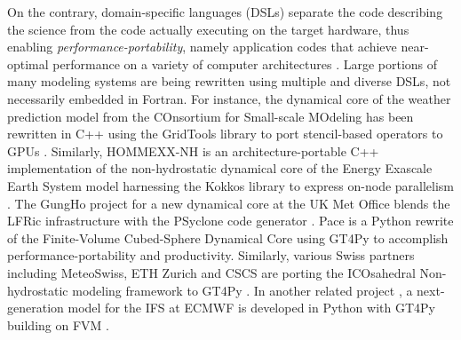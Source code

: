 \documentclass[gmd,manuscript,online]{copernicus}
\begin{document}
	On the contrary, domain-specific languages (DSLs) separate the code describing the science from the code actually executing on the target hardware, thus enabling \emph{performance-portability}, namely application codes that achieve near-optimal performance on a variety of computer architectures \citep{deakin19}. Large portions of many modeling systems are being rewritten using multiple and diverse DSLs, not necessarily embedded in Fortran. For instance, the dynamical core of the weather prediction model from the COnsortium for Small-scale MOdeling \citep[COSMO;][]{baldauf11} has been rewritten in C++ using the GridTools library \citep{afanasyev21} to port stencil-based operators to GPUs \citep{fuhrer14, fuhrer18}. Similarly, HOMMEXX-NH \citep{bertagna20} is an architecture-portable C++ implementation of the non-hydrostatic dynamical core of the Energy Exascale Earth System model \citep[E3SM;][]{taylor20} harnessing the Kokkos library to express on-node parallelism \citep{edwards14}. The GungHo project for a new dynamical core at the UK Met Office \citep{melvin19, melvin24} blends the LFRic infrastructure with the PSyclone code generator \citep{adams19}. Pace \citep{ben-nun22, dahm23} is a Python rewrite of the Finite-Volume Cubed-Sphere Dynamical Core \citep[FV3;][]{harris13} using GT4Py to accomplish performance-portability and productivity. Similarly, various Swiss partners including MeteoSwiss, ETH Zurich and CSCS are porting the ICOsahedral Non-hydrostatic modeling framework \citep[ICON;][]{zangl15} to GT4Py \citep{luz24}. In another related project \citep{kuehnlein23}, a next-generation model for the IFS at ECMWF is developed in Python with GT4Py building on FVM \citep{smolarkiewicz16, kuehnlein19}.
\end{document}
